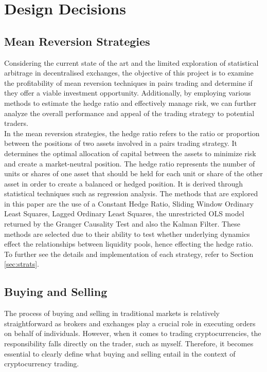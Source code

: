 \chapter{Design Decisions}

\section{Mean Reversion Strategies}
Considering the current state of the art and the limited exploration of statistical arbitrage in decentralised exchanges, the objective of this project is to examine the profitability of mean reversion techniques in pairs trading and determine if they offer a viable investment opportunity. Additionally, by employing various methods to estimate the hedge ratio and effectively manage risk, we can further analyze the overall performance and appeal of the trading strategy to potential traders.
\\[5mm]
In the mean reversion strategies, the hedge ratio refers to the ratio or proportion between the positions of two assets involved in a pairs trading strategy. It determines the optimal allocation of capital between the assets to minimize risk and create a market-neutral position. The hedge ratio represents the number of units or shares of one asset that should be held for each unit or share of the other asset in order to create a balanced or hedged position. It is derived through statistical techniques such as regression analysis. The methods that are explored in this paper are the use of a Constant Hedge Ratio, Sliding Window Ordinary Least Squares, Lagged Ordinary Least Squares, the unrestricted OLS model returned by the Granger Causality Test and also the Kalman Filter. These methods are selected due to their ability to test whether underlying dynamics effect the relationships between liquidity pools, hence effecting the hedge ratio. To further see the details and implementation of each strategy, refer to Section \ref{sec:strats}.

\section{Buying and Selling}
\label{sec:buying-selling}
The process of buying and selling in traditional markets is relatively straightforward as brokers and exchanges play a crucial role in executing orders on behalf of individuals. However, when it comes to trading cryptocurrencies, the responsibility falls directly on the trader, such as myself. Therefore, it becomes essential to clearly define what buying and selling entail in the context of cryptocurrency trading.

